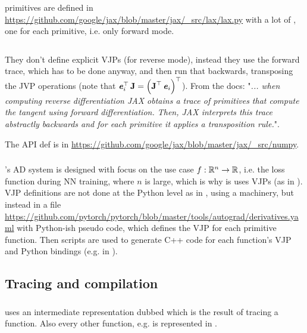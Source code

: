 \documentclass[paper=a4,11pt,headsepline]{scrartcl}
\newcommand{\ipmpy}[1]{\inputminted[xleftmargin=0.9cm]{python}{#1}}
\begin{document}
\subsubsection{\jax}

\numpy primitives are defined in
\url{https://github.com/google/jax/blob/master/jax/_src/lax/lax.py} with a lot
of , one for each primitive, i.e. only forward mode.

\ipmpy{../talk/code/jax_lax_sin.py}

They don't define explicit VJPs (for reverse mode), instead they use the
forward trace, which has to be done anyway, and then run that backwards,
transposing the JVP operations (note that $\bm{\mathit{e}}_i^\top\,\bm{\mathbf{J}} =
\left(\bm{\mathbf{J}}^\top\,\bm{\mathit{e}}_i\right)^\top$). From the docs: "\emph{... when
computing reverse differentiation JAX obtains a trace of primitives that
compute the tangent using forward differentiation. Then, JAX interprets this
trace abstractly backwards and for each primitive it applies a transposition
rule.}".

The \numpy API def is in
\url{https://github.com/google/jax/blob/master/jax/_src/numpy}.

\subsubsection{\pytorch}

\pytorch's AD system is designed with focus on the use case $f: \mathbb
R^n\rightarrow\mathbb R$, i.e. the loss function during NN training, where $n$ is
large, which is why is uses VJPs (as in \autograd). VJP definitions are not
done at the Python level as in \jax, using a  machinery, but instead
in a  file
\url{https://github.com/pytorch/pytorch/blob/master/tools/autograd/derivatives.yaml}
with Python-ish pseudo code, which defines the VJP for each 
primitive function. Then scripts are used to generate C++ code for each
function's VJP and Python bindings (e.g. in ).

\subsection{Tracing and compilation}

\subsubsection{\jax}

\jax uses an intermediate representation dubbed  which is the result
of tracing a function. Also every other function, e.g.  is
represented in .
\end{document}
